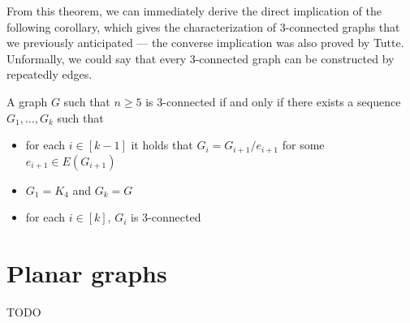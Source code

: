 \documentclass[a4paper, 12pt]{report}
\begin{document}
    From this theorem, we can immediately derive the direct implication of the following corollary, which gives the characterization of 3-connected graphs that we previously anticipated --- the converse implication was also proved by Tutte. Unformally, we could say that every 3-connected graph can be constructed by repeatedly  edges.

    \begin{framedcor}{}
        A graph $G$ such that $n \ge 5$ is 3-connected if and only if there exists a sequence $G_1, \ldots, G_k$ such that

        \begin{itemize}
            \item for each $i \in [k - 1]$ it holds that $G_i = G_{i + 1}/e_{i + 1}$ for some $e_{i + 1} \in E(G_{i + 1})$
            \item $G_1 = K_4$ and $G_k = G$
            \item for each $i \in [k]$, $G_i$ is 3-connected
        \end{itemize}
    \end{framedcor}

    \chapter{Planar graphs}

    TODO 

    \printbibliography %
\end{document}
